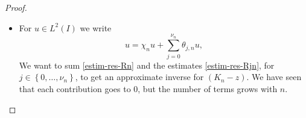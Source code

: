 \documentclass[10pt]{amsart}
\let\mathcal\mathscr
\newcommand{\Psfrac}[2]{(\sfrac{#1}{#2})}
\theoremstyle{plain}
\theoremstyle{definition}
\newcommand {\limt}[2]{\xrightarrow[#1 \to #2]{}}
\newcommand{\abs}[1]{\vert #1\vert}
\newcommand{\nr}[1]{\Vert #1\Vert}
\newcommand{\Ii}[2] {\left\{ #1,\dots,#2 \right\}}
\newcommand{\inv}{^{-1}}
\newcommand{\1}{\mathds 1}
\let\Re\relax
\DeclareMathOperator{\Re}{\mathsf{Re}\mkern2mu}
\def\C{\mathbb{C}}
\newcommand{\N}{\mathbb{N}}
\let\g\gamma
\let\th\theta
\let\h\chi
\newcommand{\Lc}{{\mathcal L}}
\begin{document}
\begin{proof}
\begin{itemize}
For $j \in \Ii 1 {\nu_n-1}$ we set $\1_j = \1_I$. We also denote by $\1_0$ the operator which maps $u \in L^2(-\ell_-,+\infty)$ to its restriction on $I$, and by $\1_{\nu_n}$ the operator which maps $u \in L^2(-\infty,\ell_+)$ to its restriction to $I$. For $z \in \C_n^-$ we set
\begin{align*}
R_{j,n}(z) &= \1_j \bigl(A_{j,n}-z \bigr)\inv \1_j^*
\\
\tag*{and}
T_{j,n}(z) &= R_{j,n}(z) \theta_{j,n} (K_n-z) - \theta_{j,n}.
\end{align*}
We proceed as above. For $j \in \Ii 0 {\nu_n}$ we have
\begin{equation*}
R_{j,n}(z) \theta_{j,n} (K_n-z)u = \theta_{j,n} u+ i n R_{j,n}(z) \theta_{j,n} r_{j,n} u - R_{j,n}(z) \th_{j,n}'' u + 2 R_{j,n}(z) \partial_y (\th_{j,n}'u),
\end{equation*}
where
\[
r_{j,n}(y) = q^2(y) - q^2(a_{j,n}) - 2\, (y-a_{j,n}) q'(a_{j,n}) q(a_{j,n}).
\]
Let $n \in \N^*$ and $j \in \Ii 0 {\nu_n}$ such that $\theta_{j,n} \neq 0$. Then we have $2n q'(a_{j,n}) \vert q(a_{j,n})\vert \gtrsim n^{1-\rho}$ and hence, for $z \in \C_n^-$ (in particular $\Re(z) \leq \g n^{\sfrac 12} \ll n^{\Psfrac 23(1-\rho)}$), Proposition~\ref{prop-Airy-R+} gives
\begin{equation} \label{estim-res-Ajn}
\nr{R_{j,n}(z)}_{\Lc(L^2(I))} \lesssim n^{-\Psfrac 23(1-\rho)}.
\end{equation}
Then, as above we have $\abs{\tilde r_{j,n}(y) \theta_{j,n}(y)} \lesssim n^{-2\tilde \rho}$ so
\[
n \nr{ R_{j,n}(z) \tilde r_{j,n} \theta_{j,n}}_{\Lc(L^2(I))} \lesssim n^{1-2\tilde \rho - \Psfrac 23(1-\rho)} \limt n {+\infty} 0.
\]
Moreover,
\begin{align*}
\nr{R_{j,n}(z) \th_{j,n}'' u }_{L^2(I)} &\lesssim n^{2\tilde \rho - \Psfrac 23 (1-\rho)} \nr{u}_{L^2(I)},\\
\nr{R_{j,n}(z) (\th'_{j,n} u)'}_{L^2(I)} &\lesssim n^{\tilde \rho - \Psfrac 13(1-\rho)} \nr{u}_{L^2(I)}.
\end{align*}
All these estimates being uniform with respect to $j \in \Ii 0 {\nu_n}$, we finally get
\begin{equation} \label{estim-res-Rjn}
\sup_{z \in \C_n^-} \sup_{0\leq j \leq \nu_n} \nr{T_{j,n}(z)}_{\Lc(L^2(I))} \limt n {+\infty} 0.
\end{equation}

\item
For $u \in L^2(I)$ we write
\[
u = \h_n u + \sum_{j=0}^{\nu_n} \th_{j,n} u,
\]
We want to sum \eqref{estim-res-Rn} and the estimates \eqref{estim-res-Rjn}, for $j \in \Ii 0 {\nu_n}$, to get an approximate inverse for $(K_n-z)$. We have seen that each contribution goes to 0, but the number of terms grows with $n$.


\end{itemize}
\end{proof}
\end{document}
